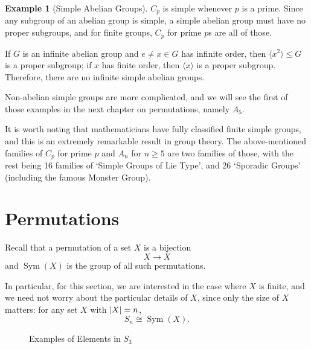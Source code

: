 \documentclass{article}
\theoremstyle{definition}
\newtheorem*{example*}{Example}
\theoremstyle{remark}
\DeclarePairedDelimiter{\abs}{\lvert}{\rvert}
\newcommand{\pqty}[1]{\left(#1\right)}
\newcommand{\angBrac}[1]{\langle #1\rangle}
\newcommand{\isomorphic}{\cong}
\newcommand{\subgroup}{\leq}
\newcommand{\Sym}{\operatorname{Sym}}
\begin{document}
\begin{example*}[Simple Abelian Groups]
    \(C_p\) is simple whenever \(p\) is a prime. Since any subgroup of an abelian group is simple, a simple abelian group must have no proper subgroups, and for finite groups, \(C_p\) for prime \(p\)s are all of those.

    If \(G\) is an infinite abelian group and \(e \neq x \in G\) has infinite order, then \(\angBrac{x^2} \subgroup G\) is a proper subgroup; if \(x\) has finite order, then \(\angBrac{x}\) is a proper subgroup. Therefore, there are no infinite simple abelian groups. 
\end{example*}

Non-abelian simple groups are more complicated, and we will see the first of those examples in the next chapter on permutations, namely \(A_5\).

It is worth noting that mathematicians have fully classified finite simple groups, and this is an extremely remarkable result in group theory. The above-mentioned families of \(C_p\) for prime \(p\) and \(A_n\) for \(n \geq 5\) are two families of those, with the rest being 16 families of `Simple Groups of Lie Type', and 26 `Sporadic Groups' (including the famous Monster Group).

\section{Permutations}
\label{sec:permutations}

Recall that a permutation of a set \(X\) is a bijection
\[
    X \to X
\]
and \(\Sym\pqty{X}\) is the group of all such permutations.

In particular, for this section, we are interested in the case where \(X\) is finite, and we need not worry about the particular details of \(X\), since only the size of \(X\) matters: for any set \(X\) with \(\abs{X} = n\),
\[
    S_n \isomorphic \Sym\pqty{X}.
\]

\begin{figure}[ht!]
    \centering
    \caption{Examples of Elements in \(S_3\)}
    \label{fig:examples-elements-s3}
\end{figure}
\end{document}
